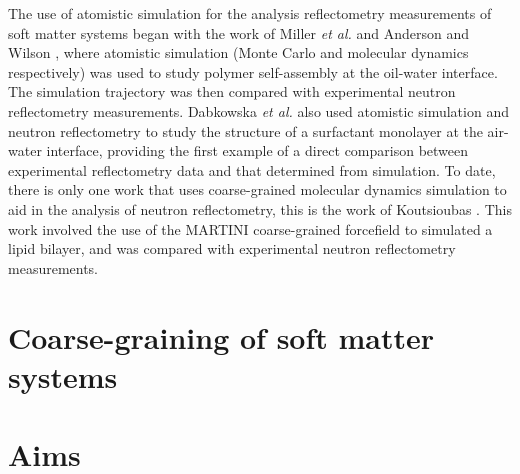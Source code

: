 The use of atomistic simulation for the analysis reflectometry measurements of soft matter systems began with the work of Miller \emph{et al.} and Anderson and Wilson \cite{miller_monte_2003,anderson_molecular_2004}, where atomistic simulation (Monte Carlo and molecular dynamics respectively) was used to study polymer self-assembly at the oil-water interface. 
The simulation trajectory was then compared with experimental neutron reflectometry measurements. 
Dabkowska \emph{et al.} also used atomistic simulation and neutron reflectometry to study the structure of a surfactant monolayer at the air-water interface, providing the first example of a direct comparison between experimental reflectometry data and that determined from simulation. 
To date, there is only one work that uses coarse-grained molecular dynamics simulation to aid in the analysis of neutron reflectometry, this is the work of Koutsioubas \cite{koutsioubas_combined_2016}. 
This work involved the use of the MARTINI coarse-grained forcefield to simulated a lipid bilayer, and was compared with experimental neutron reflectometry measurements. 

\section{Coarse-graining of soft matter systems}

\section{Aims}
